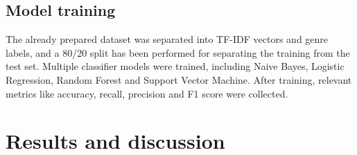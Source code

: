 \documentclass[11pt, a4paper]{article}
\begin{document}
\subsection{Model training}\label{subsec:model-training}
The already prepared dataset was separated into TF-IDF vectors and genre labels, and a 80/20 split has been performed
for separating the training from the test set.
Multiple classifier models were trained, including Naive Bayes, Logistic Regression, Random Forest and Support Vector
Machine.
After training, relevant metrics like accuracy, recall, precision and F1 score were collected.




\section{Results and discussion}\label{sec:results-and-discussion}








\end{document}
